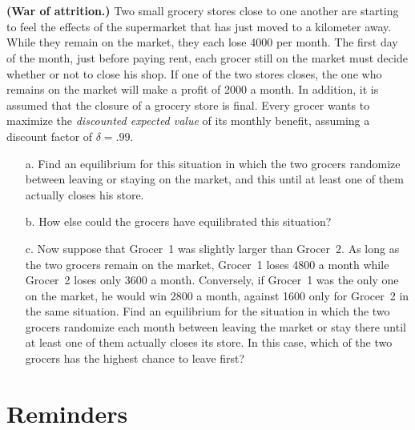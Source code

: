 \documentclass{../ape}
\begin{document}
\section{}
\textbf{(War of attrition.)} Two small grocery stores close to one another are starting to feel the effects of the supermarket that has just moved to a kilometer away. While they remain on the market, they each lose \SI{4000}{\EUR} per month. The first day of the month, just before paying rent, each grocer still on the market must decide whether or not to close his shop. If one of the two stores closes, the one who remains on the market will make a profit of \SI{2000}{\EUR} a month. In addition, it is assumed that the closure of a grocery store is final. Every grocer wants to maximize the \emph{discounted expected value} of its monthly benefit, assuming a discount factor of $\delta = .99$.
\begin{enumerate}
	\item[a.] Find an equilibrium for this situation in which the two grocers randomize between leaving or staying on the market, and this until at least one of them actually closes his store.
	\item[b.] How else could the grocers have equilibrated this situation?
	\item[c.] Now suppose that Grocer~1 was slightly larger than Grocer~2. As long as the two grocers remain on the market, Grocer~1 loses \SI{4800}{\EUR} a month while Grocer~2 loses only \SI{3600}{\EUR} a month. Conversely, if Grocer~1 was the only one on the market, he would win \SI{2800}{\EUR} a month, against \SI{1600}{\EUR} only for Grocer~2 in the same situation. Find an equilibrium for the situation in which the two grocers randomize each month between leaving the market or stay there until at least one of them actually closes its store. In this case, which of the two grocers has the highest chance to leave first?
\end{enumerate}


\newpage

\section*{Reminders}
\end{document}
